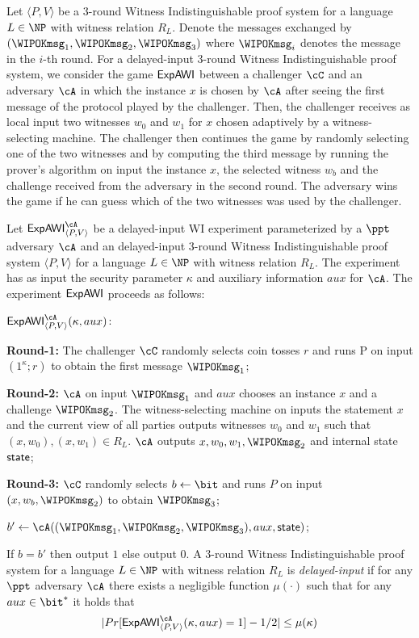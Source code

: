 Let  $\langle P, V \rangle$ be a 3-round Witness Indistinguishable proof system for a language $L \in \NP$ with witness relation
$R_L$.  Denote the messages exchanged by $(\WIPOKmsg_1, \WIPOKmsg_{2}, \WIPOKmsg_{3})$ where $\WIPOKmsg_i$ denotes the message in the $i$-th round.
For a delayed-input $3$-round Witness Indistinguishable proof system, we
consider the game ${\sf ExpAWI}$ between a challenger $\cC$ and an adversary $\cA$ in which the instance $x$ is chosen by $\cA$ after seeing the first message of the protocol played
by the challenger. Then, the challenger receives as local input two witnesses $w_0$ and $w_1$ for $x$ chosen adaptively by
a witness-selecting machine. The challenger then continues the game by randomly selecting one of the two
witnesses and by computing the third message by running the prover's algorithm on input the
instance $x$, the selected witness $w_b$ and the challenge received from the adversary in the second round. The adversary
wins the game if he can guess which of the two witnesses was used by the challenger.


 \label{dWI}\label{def:dWI}
Let ${\sf ExpAWI}_{\langle P, V \rangle}^\cA$ be a delayed-input WI experiment parameterized by a $\ppt$
adversary $\cA$ and an delayed-input $3$-round Witness Indistinguishable proof system $\langle P, V \rangle$ for a language $L \in \NP$ with witness relation
$R_L$. The experiment has as input the security parameter $\kappa$ and auxiliary information $aux$ for $\cA$. 
The experiment ${\sf ExpAWI}$ proceeds as follows: 
\BE
\item[]${\sf ExpAWI}_{\langle P, V \rangle}^\cA(\kappa, aux)$:
\BE
\item[] {\bf Round-1:} The challenger $\cC$ randomly selects coin tosses $r$ and runs P on input $(1^\kappa; r)$ to obtain the first message $\WIPOKmsg_1$;
\item[] {\bf Round-2:}  $\cA$ on input $\WIPOKmsg_1$ and $aux$ chooses an instance $x$ and a challenge $\WIPOKmsg_2$. The witness-selecting machine on inputs the statement $x$ and the current
view of all parties outputs witnesses $w_0$ and $w_1$ such that
$(x,w_0), (x,w_1) \in R_L$. $\cA$ outputs $x, w_0, w_1, \WIPOKmsg_2$ and internal state $\sf state$;
\item[] {\bf Round-3:} $\cC$ randomly selects $b\leftarrow \bit$ and runs $P$ on input $(x,w_b, \WIPOKmsg_2)$ to obtain $\WIPOKmsg_3$;
\item[] $b'  \leftarrow \cA((\WIPOKmsg_1, \WIPOKmsg_2, \WIPOKmsg_3), aux, \sf state)$; 
\item[] If $b = b'$ then output $1$ else output $0$.
\EE
\EE
 A $3$-round Witness Indistinguishable proof system for a language $L \in \NP$ with witness relation
$R_L$ is \emph{delayed-input} if for any $\ppt$ adversary $\cA$ there exists a negligible function $\mu(\cdot)$ such that for any $aux \in\bit^*$ it holds that 
 $$|Pr[{\sf ExpAWI}_{\langle P, V \rangle}^\cA(\kappa, aux)=1]-1/2|\leq \mu(\kappa) $$
\ED

